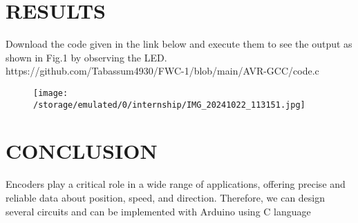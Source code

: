 \documentclass[conference]{IEEEtran}
\begin{document}
\section{RESULTS}
Download the code given in the link below and execute them to see the output as shown in Fig.1 by observing the LED. 
 \\ https://github.com/Tabassum4930/FWC-1/blob/main/AVR-GCC/code.c

\begin {figure} [h] 
	\centering 
	\texttt{[image: /storage/emulated/0/internship/IMG\_20241022\_113151.jpg]}
	\caption{\label{fig:Gates}}    
\end {figure}
\section{CONCLUSION}
Encoders play a critical role in a wide range of applications, offering precise and reliable data about position, speed, and direction. Therefore, we can design several circuits and can be implemented with Arduino using C language
\end{document}
